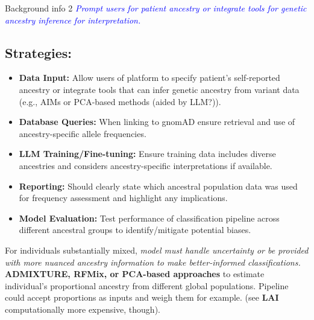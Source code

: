 \documentclass[twocolumn]{article}
\begin{document}
\begin{literaturepaper}{Background info 2}
\textit{\textcolor{blue}{Prompt users for patient ancestry or integrate tools for genetic ancestry inference for interpretation.}}      
\subsection*{Strategies:}

\begin{itemize}
    \item \textbf{Data Input:} Allow users of platform to specify patient's self-reported ancestry or integrate tools that can infer genetic ancestry from variant data (e.g., AIMs or PCA-based methods (aided by LLM?)).
    \item \textbf{Database Queries:} When linking to gnomAD ensure retrieval and use of ancestry-specific allele frequencies.
    \item \textbf{LLM Training/Fine-tuning:} Ensure training data includes diverse ancestries and considers ancestry-specific interpretations if available.
    \item \textbf{Reporting:} Should clearly state which ancestral population data was used for frequency assessment and highlight any implications.
    \item \textbf{Model Evaluation:} Test performance of classification pipeline across different ancestral groups to identify/mitigate potential biases.
    \end{itemize}

    For individuals substantially mixed, \textit{model must handle uncertainty or be provided with more nuanced ancestry information to make better-informed classifications.} \textbf{ADMIXTURE, RFMix, or PCA-based approaches} to estimate individual's proportional ancestry from different global populations.  Pipeline could accept proportions as inputs and weigh them for example. (see \textbf{LAI} computationally more expensive, though).
                 
\end{literaturepaper}
\end{document}

